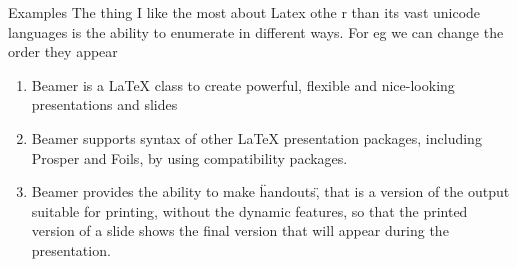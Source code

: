 \documentclass{beamer}
\begin{document}
\begin{frame}{Examples}
The thing I like the most about Latex othe r than its vast unicode languages is the  ability to enumerate in different ways. For eg we can change the order they appear 
\begin{enumerate}
\item<1> Beamer is a LaTeX class to create powerful, flexible and nice-looking presentations and slides\\
\item<3> Beamer supports syntax of other LaTeX presentation packages, including Prosper and Foils, by using compatibility packages.\\
\item<2> Beamer provides the ability to make \"handouts\", that is a version of the output suitable for printing, without the dynamic features, so that the printed version of a slide shows the final version that will appear during the presentation. \\
\end{enumerate}
\end{frame}
\end{document}
